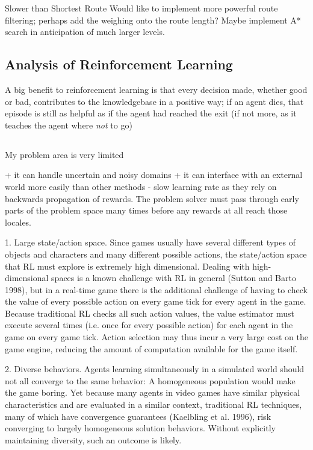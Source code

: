 \documentclass[a4paper,oneside]{report}
\begin{document}
Slower than Shortest Route
Would like to implement more powerful route filtering; perhaps add the weighing onto the route length? Maybe implement A* search in anticipation of much larger levels.

\subsection{Analysis of Reinforcement Learning}

A big benefit to reinforcement learning is that every decision made, whether good or bad, contributes to the knowledgebase in a positive way; if an agent dies, that episode is still as helpful as if the agent had reached the exit (if not more, as it teaches the agent where \emph{not} to go)

\subsection{}

My problem area is very limited

+ it can handle uncertain and noisy domains
+ it can interface with an external world more easily than other methods
- slow learning rate as they rely on backwards propagation of rewards. The problem solver must pass through early parts of the problem space many times before any rewards at all reach those locales.

1. Large state/action space. Since games usually have several different types of objects and characters and many different possible actions, the state/action space that RL must explore is extremely high dimensional. Dealing with high-dimensional spaces is a known challenge with RL in general (Sutton and Barto 1998), but in a real-time game there is the additional challenge of having to check the value of every possible action on every game tick for every agent in the game. Because traditional RL checks all such action values, the value estimator must execute several times (i.e. once for every possible action) for each agent in the game on every game tick. Action selection may thus incur a very large cost on the game engine, reducing the amount of computation available for the game itself.

2. Diverse behaviors. Agents learning simultaneously in a simulated world should not all converge to the same behavior: A homogeneous population would make the game boring. Yet because many agents in video games have similar physical characteristics and are evaluated in a similar context, traditional RL techniques, many of which have convergence guarantees (Kaelbling et al. 1996), risk converging to largely homogeneous solution behaviors. Without explicitly maintaining diversity, such an outcome is likely.
\end{document}
